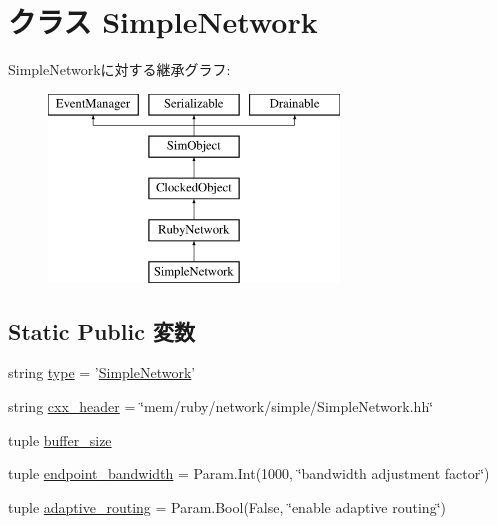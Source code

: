 \hypertarget{classSimpleNetwork_1_1SimpleNetwork}{
\section{クラス SimpleNetwork}
\label{classSimpleNetwork_1_1SimpleNetwork}
}
SimpleNetworkに対する継承グラフ:\begin{figure}[H]
\begin{center}
\leavevmode
\includegraphics[height=5cm]{classSimpleNetwork_1_1SimpleNetwork}
\end{center}
\end{figure}
\subsection*{Static Public 変数}
\begin{DoxyCompactItemize}
\item 
string \hyperlink{classSimpleNetwork_1_1SimpleNetwork_acce15679d830831b0bbe8ebc2a60b2ca}{type} = '\hyperlink{classSimpleNetwork_1_1SimpleNetwork}{SimpleNetwork}'
\item 
string \hyperlink{classSimpleNetwork_1_1SimpleNetwork_a17da7064bc5c518791f0c891eff05fda}{cxx\_\-header} = \char`\"{}mem/ruby/network/simple/SimpleNetwork.hh\char`\"{}
\item 
tuple \hyperlink{classSimpleNetwork_1_1SimpleNetwork_a0f14097399fa367505d7d06197f1498c}{buffer\_\-size}
\item 
tuple \hyperlink{classSimpleNetwork_1_1SimpleNetwork_aaa8f6361a828ef28c2d06ac81d57bf1b}{endpoint\_\-bandwidth} = Param.Int(1000, \char`\"{}bandwidth adjustment factor\char`\"{})
\item 
tuple \hyperlink{classSimpleNetwork_1_1SimpleNetwork_ad9fbf9df67441ea1f5a11fc6c6755696}{adaptive\_\-routing} = Param.Bool(False, \char`\"{}enable adaptive routing\char`\"{})
\end{DoxyCompactItemize}


